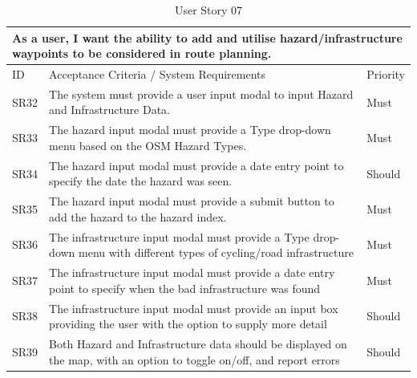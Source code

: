\begin{table}[!htb]
  \caption{User Story 07}
  \label{tab:user-story-07}
  \begin{tabular}{ m{1cm} m{11cm} m{1cm} }
  \hline
  \multicolumn{3}{p{13cm}}{As a user, I want the ability to add and utilise hazard/infrastructure waypoints to be considered in route planning.}\\ 
  \hline
  ID & Acceptance Criteria / System Requirements & Priority\\
  \hline
  \label{SR:32}SR32 & The system must provide a user input modal to input Hazard and Infrastructure Data. & Must \\
  \label{SR:33}SR33 & The hazard input modal must provide a Type drop-down menu based on the OSM Hazard Types. & Must\\
  \label{SR:34}SR34 & The hazard input modal must provide a date entry point to specify the date the hazard was seen. & Should\\
  \label{SR:35}SR35 & The hazard input modal must provide a submit button to add the hazard to the hazard index. & Must\\
  \label{SR:36}SR36 & The infrastructure input modal must provide a Type drop-down menu with different types of cycling/road infrastructure & Must\\
  \label{SR:37}SR37 & The infrastructure input modal must provide a date entry point to specify when the bad infrastructure was found & Must\\
  \label{SR:38}SR38 & The infrastructure input modal must provide an input box providing the user with the option to supply more detail & Should\\
  \label{SR:39}SR39 & Both Hazard and Infrastructure data should be displayed on the map, with an option to toggle on/off, and report errors & Should\\
  \hline
  \end{tabular}
\end{table}

